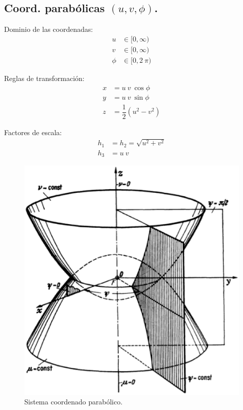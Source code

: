 \subsection{Coord. parabólicas \texorpdfstring{$(u, v, \phi)$}{(u, v, f)}.}

\begin{minipage}{0.4\textwidth}
Dominio de las coordenadas:
\begin{align*}
u &\in [0, \infty) \\
v &\in [0, \infty) \\
\phi &\in [0, 2 \: \pi)
\end{align*}
\end{minipage}
\hspace{1cm}
\begin{minipage}{0.4\textwidth}
Reglas de transformación:
\begin{align*}
x &= u \: v \: \cos \phi \\
y &= u \: v \: \sin \phi \\
z &= \dfrac{1}{2} (u^{2} - v^{2})
\end{align*}
\end{minipage}

Factores de escala:
\begin{align*}
h_{1} &= h_{2} = \sqrt{u^{2 } +v^{2}} \\
h_{3} &= u \: v
\end{align*}

\begin{figure}[H]
    \centering
    \includegraphics[scale=0.5]{Imagenes/Sistema_Parabolico.eps}
    \caption{Sistema coordenado parabólico.}
\end{figure}

